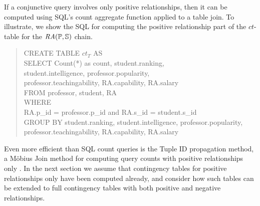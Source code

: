 \documentclass{sig-alternate-2013}
\newcommand{\ct}{\mathit{ct}}
\begin{document}
If a conjunctive query involves only positive relationships, then it can be computed using SQL's count aggregate function applied to a table join. To illustrate, we show the SQL for computing the positive relationship part of the $\ct$-table for the $\mathit{RA}(\mathbb{P},\mathbb{S})$ chain.
%
\begin{quote}
CREATE TABLE $\ct_{T}$  AS 
\\SELECT Count(*) as  count,  student.ranking, \\student.intelligence, professor.popularity,\\ professor.teachingability, RA.capability, RA.salary  \\
FROM professor, student, RA  \\
WHERE  \\RA.p\_id = professor.p\_id and RA.s\_id = student.s\_id  \\
GROUP BY student.ranking,  student.intelligence, professor.popularity,  professor.teachingability, RA.capability,  RA.salary
\end{quote}
Even more efficient than SQL count queries is the Tuple ID propagation method, a M\"obius Join method for computing query counts with positive relationships only \cite{Yin2004}. 
In the next section we assume that contingency tables for positive relationships only have been computed already, and consider how such tables can be extended to full contingency tables with both positive and negative relationships.

\end{document}
